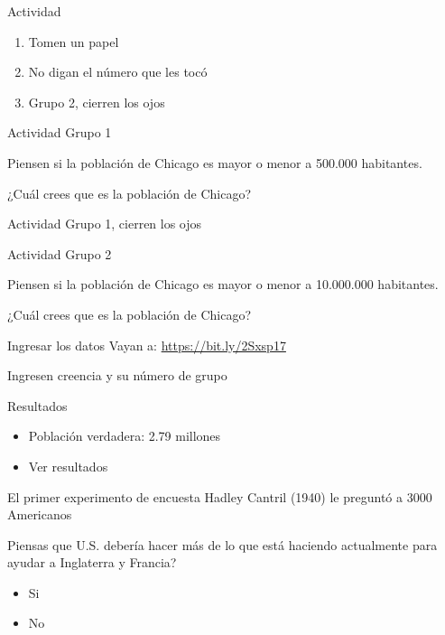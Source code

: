 \documentclass[
  ignorenonframetext,
]{beamer}
\providecommand{\tightlist}{%
  \setlength{\itemsep}{0pt}\setlength{\parskip}{0pt}}
\begin{document}
\begin{frame}{Actividad}
\protect\hypertarget{actividad}{}
\begin{enumerate}
\tightlist
\item
  Tomen un papel
\item
  No digan el número que les tocó
\item
  Grupo 2, cierren los ojos
\end{enumerate}
\end{frame}

\begin{frame}{Actividad}
\protect\hypertarget{actividad-1}{}
Grupo 1

Piensen si la población de Chicago es mayor o menor a 500.000
habitantes.

¿Cuál crees que es la población de Chicago?
\end{frame}

\begin{frame}{Actividad}
\protect\hypertarget{actividad-2}{}
Grupo 1, cierren los ojos
\end{frame}

\begin{frame}{Actividad}
\protect\hypertarget{actividad-3}{}
Grupo 2

Piensen si la población de Chicago es mayor o menor a 10.000.000
habitantes.

¿Cuál crees que es la población de Chicago?
\end{frame}

\begin{frame}{Ingresar los datos}
\protect\hypertarget{ingresar-los-datos}{}
Vayan a: \url{https://bit.ly/2Sxsp17}

Ingresen creencia y su número de grupo
\end{frame}

\begin{frame}{Resultados}
\protect\hypertarget{resultados}{}
\begin{itemize}
\item
  Población verdadera: 2.79 millones
\item
  Ver resultados
\end{itemize}
\end{frame}

\begin{frame}{El primer experimento de encuesta}
\protect\hypertarget{el-primer-experimento-de-encuesta}{}
Hadley Cantril (1940) le preguntó a 3000 Americanos

Piensas que U.S. debería hacer más de lo que está haciendo actualmente
para ayudar a Inglaterra y Francia?

\begin{itemize}
\tightlist
\item
  Si
\item
  No
\end{itemize}
\end{frame}
\end{document}
